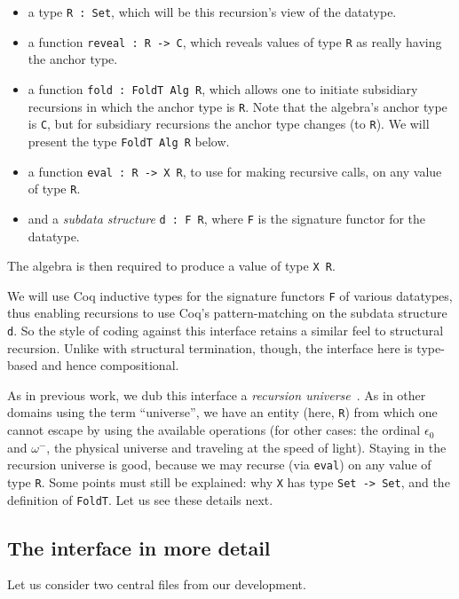 \documentclass[a4paper,USenglish]{lipics-v2021}
\begin{document}
\begin{itemize}
\item a type \verb|R : Set|, which will be this recursion's view of the datatype.
\item a function \verb|reveal : R -> C|, which reveals values of type \verb|R| as really having the anchor type.  
\item a function \verb|fold : FoldT Alg R|, which allows one to initiate subsidiary recursions in which the anchor type is \verb|R|.  Note that the algebra's anchor type is \verb|C|, but for subsidiary recursions the anchor type changes (to \verb|R|). We will present the type \verb|FoldT Alg R| below.
\item a function \verb|eval : R -> X R|, to use for making recursive calls, on any value of type \verb|R|.
\item and a \emph{subdata structure} \verb|d : F R|, where \verb|F| is the signature functor for the datatype.
\end{itemize}

\noindent The algebra is then required to produce a value of type \verb|X R|.

We will use Coq inductive types for the signature functors \verb|F| of
various datatypes, thus enabling recursions to use Coq's
pattern-matching on the subdata structure \verb|d|.  So the style of
coding against this interface retains a similar feel to structural
recursion.  Unlike with structural termination, though, the interface
here is type-based and hence compositional.  

As in previous work, we dub this interface a \emph{recursion
universe}~\cite{stump20}.  As in other domains using the term
``universe'', we have an entity (here, \verb|R|) from which one cannot
escape by using the available operations (for other cases:
the ordinal $\epsilon_0$ and $\omega^-$, the physical universe and traveling at
the speed of light).  Staying in the recursion universe is good,
because we may recurse (via \verb|eval|) on any value of type
\verb|R|.  Some points must still be explained: why \verb|X| has type \verb|Set -> Set|,
and the definition of \verb|FoldT|.  Let us see these details next.

\subsection{The interface in more detail}

Let us consider two central files from our development.
\end{document}
